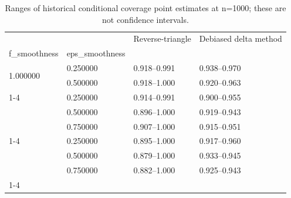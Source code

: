 \begin{table}
\caption{Ranges of historical conditional coverage point estimates at n=1000; these are not confidence intervals.}
\label{tab:experiment_details_additional_coverage_summary_N1000}
\begin{tabular}{llll}
\toprule
 &  & Reverse-triangle & Debiased delta method \\
f_smoothness & eps_smoothness &  &  \\
\midrule
\multirow[t]{2}{*}{1.000000} & 0.250000 & 0.918--0.991 & 0.938--0.970 \\
 & 0.500000 & 0.918--1.000 & 0.920--0.963 \\
\cline{1-4}
\multirow[t]{3}{*}{1.500000} & 0.250000 & 0.914--0.991 & 0.900--0.955 \\
 & 0.500000 & 0.896--1.000 & 0.919--0.943 \\
 & 0.750000 & 0.907--1.000 & 0.915--0.951 \\
\cline{1-4}
\multirow[t]{3}{*}{2.000000} & 0.250000 & 0.895--1.000 & 0.917--0.960 \\
 & 0.500000 & 0.879--1.000 & 0.933--0.945 \\
 & 0.750000 & 0.882--1.000 & 0.925--0.943 \\
\cline{1-4}
\bottomrule
\end{tabular}
\end{table}
